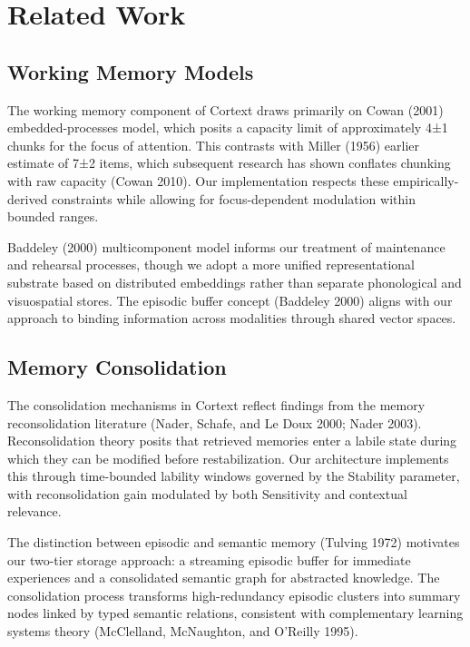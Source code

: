\documentclass[
  letterpaper,
  DIV=11,
  numbers=noendperiod]{scrartcl}
\begin{document}
\section{Related Work}\label{related-work}

\subsection{Working Memory Models}\label{working-memory-models}

The working memory component of Cortext draws primarily on Cowan (2001)
embedded-processes model, which posits a capacity limit of approximately
4±1 chunks for the focus of attention. This contrasts with Miller (1956)
earlier estimate of 7±2 items, which subsequent research has shown
conflates chunking with raw capacity (Cowan 2010). Our implementation
respects these empirically-derived constraints while allowing for
focus-dependent modulation within bounded ranges.

Baddeley (2000) multicomponent model informs our treatment of
maintenance and rehearsal processes, though we adopt a more unified
representational substrate based on distributed embeddings rather than
separate phonological and visuospatial stores. The episodic buffer
concept (Baddeley 2000) aligns with our approach to binding information
across modalities through shared vector spaces.

\subsection{Memory Consolidation}\label{memory-consolidation}

The consolidation mechanisms in Cortext reflect findings from the memory
reconsolidation literature (Nader, Schafe, and Le Doux 2000; Nader
2003). Reconsolidation theory posits that retrieved memories enter a
labile state during which they can be modified before restabilization.
Our architecture implements this through time-bounded lability windows
governed by the Stability parameter, with reconsolidation gain modulated
by both Sensitivity and contextual relevance.

The distinction between episodic and semantic memory (Tulving 1972)
motivates our two-tier storage approach: a streaming episodic buffer for
immediate experiences and a consolidated semantic graph for abstracted
knowledge. The consolidation process transforms high-redundancy episodic
clusters into summary nodes linked by typed semantic relations,
consistent with complementary learning systems theory (McClelland,
McNaughton, and O'Reilly 1995).
\end{document}
